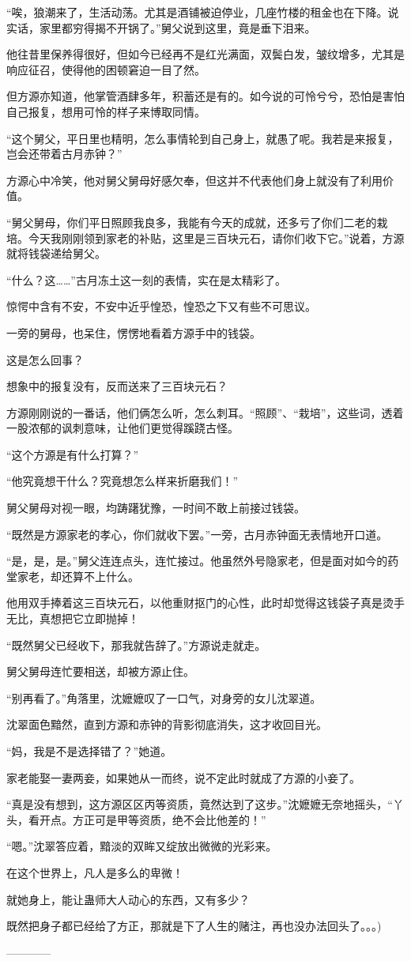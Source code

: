 \begin{this_body}
“唉，狼潮来了，生活动荡。尤其是酒铺被迫停业，几座竹楼的租金也在下降。说实话，家里都穷得揭不开锅了。”舅父说到这里，竟是垂下泪来。

他往昔里保养得很好，但如今已经再不是红光满面，双鬓白发，皱纹增多，尤其是响应征召，使得他的困顿窘迫一目了然。

但方源亦知道，他掌管酒肆多年，积蓄还是有的。如今说的可怜兮兮，恐怕是害怕自己报复，想用可怜的样子来博取同情。

“这个舅父，平日里也精明，怎么事情轮到自己身上，就愚了呢。我若是来报复，岂会还带着古月赤钟？”

方源心中冷笑，他对舅父舅母好感欠奉，但这并不代表他们身上就没有了利用价值。

“舅父舅母，你们平日照顾我良多，我能有今天的成就，还多亏了你们二老的栽培。今天我刚刚领到家老的补贴，这里是三百块元石，请你们收下它。”说着，方源就将钱袋递给舅父。

“什么？这……”古月冻土这一刻的表情，实在是太精彩了。

惊愕中含有不安，不安中近乎惶恐，惶恐之下又有些不可思议。

一旁的舅母，也呆住，愣愣地看着方源手中的钱袋。

这是怎么回事？

想象中的报复没有，反而送来了三百块元石？

方源刚刚说的一番话，他们俩怎么听，怎么刺耳。“照顾”、“栽培”，这些词，透着一股浓郁的讽刺意味，让他们更觉得蹊跷古怪。

“这个方源是有什么打算？”

“他究竟想干什么？究竟想怎么样来折磨我们！”

舅父舅母对视一眼，均踌躇犹豫，一时间不敢上前接过钱袋。

“既然是方源家老的孝心，你们就收下罢。”一旁，古月赤钟面无表情地开口道。

“是，是，是。”舅父连连点头，连忙接过。他虽然外号隐家老，但是面对如今的药堂家老，却还算不上什么。

他用双手捧着这三百块元石，以他重财抠门的心性，此时却觉得这钱袋子真是烫手无比，真想把它立即抛掉！

“既然舅父已经收下，那我就告辞了。”方源说走就走。

舅父舅母连忙要相送，却被方源止住。

“别再看了。”角落里，沈嬷嬷叹了一口气，对身旁的女儿沈翠道。

沈翠面色黯然，直到方源和赤钟的背影彻底消失，这才收回目光。

“妈，我是不是选择错了？”她道。

家老能娶一妻两妾，如果她从一而终，说不定此时就成了方源的小妾了。

“真是没有想到，这方源区区丙等资质，竟然达到了这步。”沈嬷嬷无奈地摇头，“丫头，看开点。方正可是甲等资质，绝不会比他差的！”

“嗯。”沈翠答应着，黯淡的双眸又绽放出微微的光彩来。

在这个世界上，凡人是多么的卑微！

就她身上，能让蛊师大人动心的东西，又有多少？

既然把身子都已经给了方正，那就是下了人生的赌注，再也没办法回头了。。。)

------------

\end{this_body}

